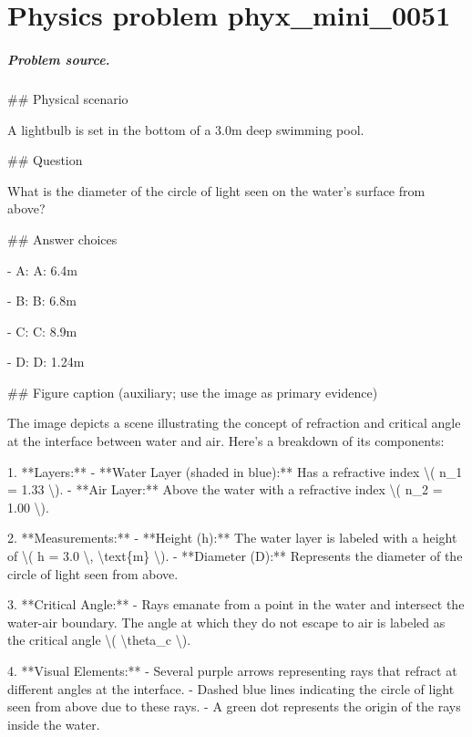 
\chapter{Physics problem phyx\_mini\_0051}
\label{ch:PhyXMiniProblems_problem_phyx_mini_0051}

\paragraph{Problem source.}
\#\# Physical scenario

A lightbulb is set in the bottom of a 3.0m deep swimming pool.

\#\# Question

What is the diameter of the circle of light seen on the water’s surface from above?

\#\# Answer choices

- A: A: 6.4m

- B: B: 6.8m

- C: C: 8.9m

- D: D: 1.24m

\#\# Figure caption (auxiliary; use the image as primary evidence)

The image depicts a scene illustrating the concept of refraction and critical angle at the interface between water and air. Here's a breakdown of its components:

1. **Layers:**
   - **Water Layer (shaded in blue):** Has a refractive index \textbackslash{}( n\_1 = 1.33 \textbackslash{}).
   - **Air Layer:** Above the water with a refractive index \textbackslash{}( n\_2 = 1.00 \textbackslash{}).

2. **Measurements:**
   - **Height (h):** The water layer is labeled with a height of \textbackslash{}( h = 3.0 \textbackslash{}, \textbackslash{}text\{m\} \textbackslash{}).
   - **Diameter (D):** Represents the diameter of the circle of light seen from above.

3. **Critical Angle:**
   - Rays emanate from a point in the water and intersect the water-air boundary. The angle at which they do not escape to air is labeled as the critical angle \textbackslash{}( \textbackslash{}theta\_c \textbackslash{}).

4. **Visual Elements:**
   - Several purple arrows representing rays that refract at different angles at the interface.
   - Dashed blue lines indicating the circle of light seen from above due to these rays.
   - A green dot represents the origin of the rays inside the water.

